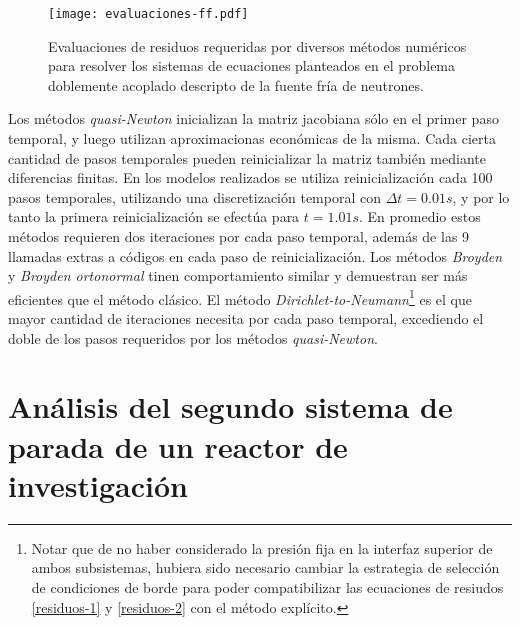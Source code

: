 \begin{figure}[ht]
\centering{}\texttt{[image: evaluaciones-ff.pdf]}
\caption
{Evaluaciones de residuos requeridas por diversos métodos numéricos para resolver los sistemas de ecuaciones planteados
 en el problema doblemente acoplado descripto de la fuente fría de neutrones.} \label{iteraciones_ri} 
\end{figure}

Los métodos \textit{quasi-Newton} inicializan la matriz jacobiana sólo en el primer paso temporal,
y luego utilizan aproximacionas económicas de la misma. 
Cada cierta cantidad de pasos temporales pueden reinicializar la matriz también mediante diferencias finitas. 
En los modelos realizados se utiliza reinicialización cada 100 pasos temporales,
utilizando una discretización temporal con $\Delta t=0.01s$, 
y por lo tanto la primera reinicialización se efectúa para $t=1.01s$.
En promedio estos métodos requieren dos iteraciones por cada paso temporal, 
además de las 9 llamadas extras a códigos en cada paso de reinicialización.
Los métodos \textit{Broyden} y \textit{Broyden ortonormal} tinen comportamiento similar y demuestran ser más eficientes que el método clásico.
El método \textit{Dirichlet-to-Neumann}\footnote{
Notar que de no haber considerado la presión fija en la interfaz superior de ambos subsistemas,
hubiera sido necesario cambiar la estrategia de selección de condiciones de borde para poder compatibilizar las ecuaciones de resiudos \ref{residuos-1} y \ref{residuos-2} con el método explícito.
} es el que mayor cantidad de iteraciones necesita por cada paso temporal, 
excediendo el doble de los pasos requeridos por los métodos \textit{quasi-Newton}.

\section{Análisis del segundo sistema de parada de un reactor de investigación}
\label{3:mockup}

